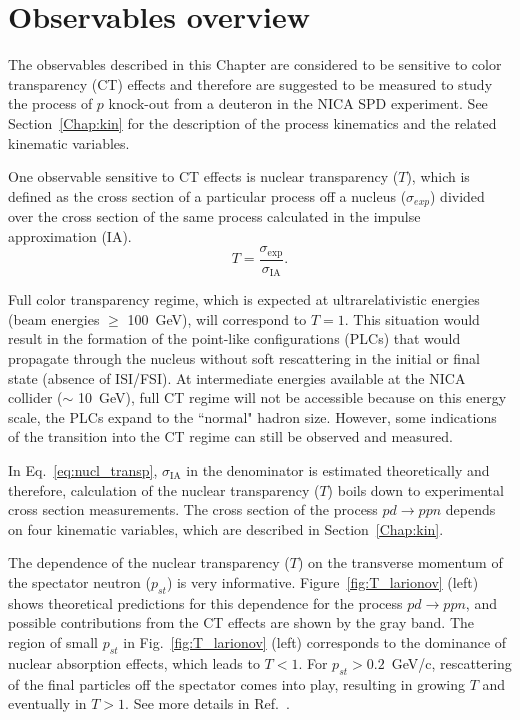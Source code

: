 \newpage
\chapter{Observables overview}
\mbox{}\vspace{-\baselineskip}
\label{Chapter_observables}

The observables described in this Chapter are considered to be sensitive to color transparency (CT) effects and therefore are suggested to be measured to study the process of $p$ knock-out from a deuteron in the NICA SPD experiment. See Section~\ref{Chap:kin} for the description of the process kinematics and the related kinematic variables.

One observable sensitive to CT effects is nuclear transparency ($T$), which is defined as the cross section of a particular process off a nucleus ($\sigma_{exp}$) divided over the cross section of the same process calculated in the impulse approximation (IA). 
\begin{equation}
T = \frac{\sigma_{\textrm{exp}}}{\sigma_{\textrm{IA}}}.\label{eq:nucl_transp}
\end{equation}

Full color transparency regime, which is expected at ultrarelativistic energies (beam energies $\geq$ 100~GeV), will correspond to $T = 1$. This situation would result in the formation of the point-like configurations (PLCs) that would propagate through the nucleus without soft rescattering in the initial or final state (absence of ISI/FSI). At intermediate energies available at the NICA collider ($\sim$ 10~GeV), full CT regime will not be accessible because on this energy scale, the PLCs expand to the ``normal" hadron size. However, some indications of the transition into the CT regime can still be observed and measured.



In Eq.~\eqref{eq:nucl_transp}, $\sigma_{\textrm{IA}}$ in the denominator is estimated theoretically and therefore, calculation of the nuclear transparency ($T$) boils down to experimental cross section measurements. The cross section of the process $pd\rightarrow ppn$ depends on four kinematic variables, which are described in Section~\ref{Chap:kin}.

The dependence of the nuclear transparency ($T$) on the transverse momentum of the spectator neutron ($p_{st}$) is very informative. Figure~\ref{fig:T_larionov} (left) shows theoretical predictions for this dependence for the process $pd\rightarrow ppn$, and possible contributions from the CT effects are shown by the gray band. The region of small $p_{st}$ in Fig.~\ref{fig:T_larionov} (left) corresponds to the dominance of nuclear absorption effects, which leads to $T < 1$. For $p_{st} > 0.2$~GeV/c, rescattering of the final particles off the spectator comes into play, resulting in growing $T$ and eventually in $T > 1$. See more details in Ref.~\cite{Larionov:2025equ}.


